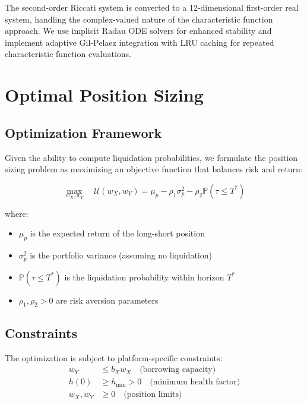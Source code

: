 \documentclass{article}
\renewcommand{\P}{\mathbb{P}}
\theoremstyle{definition}
\begin{document}
The second-order Riccati system is converted to a 12-dimensional first-order real system, handling the complex-valued nature of the characteristic function approach. We use implicit Radau ODE solvers for enhanced stability and implement adaptive Gil-Pelaez integration with LRU caching for repeated characteristic function evaluations.

\section{Optimal Position Sizing}

\subsection{Optimization Framework}

Given the ability to compute liquidation probabilities, we formulate the position sizing problem as maximizing an objective function that balances risk and return:

\begin{equation}
\max_{w_X, w_Y} \quad \mathcal{U}(w_X, w_Y) = \mu_p - \rho_1 \sigma_p^2 - \rho_2 \P(\tau \leq T^*) \label{eq:objective}
\end{equation}

where:
\begin{itemize}
    \item $\mu_p$ is the expected return of the long-short position
    \item $\sigma_p^2$ is the portfolio variance (assuming no liquidation)
    \item $\P(\tau \leq T^*)$ is the liquidation probability within horizon $T^*$
    \item $\rho_1, \rho_2 > 0$ are risk aversion parameters
\end{itemize}

\subsection{Constraints}

The optimization is subject to platform-specific constraints:
\begin{align}
w_Y &\leq b_X w_X \quad \text{(borrowing capacity)} \\
h(0) &\geq h_{\min} > 0 \quad \text{(minimum health factor)} \\
w_X, w_Y &\geq 0 \quad \text{(position limits)}
\end{align}
\end{document}
